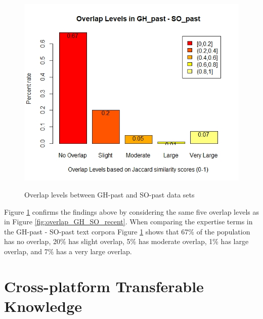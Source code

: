         \begin{figure}
          \centering
          \includegraphics[width=\textwidth]{figures/overlap_SO_GH_past.jpeg}\\
          \caption{Overlap levels between GH-past and SO-past data sets}
          \label{fig:overlap_GH_SO_past}
        \end{figure}
        
        Figure \ref{fig:overlap_GH_SO_past} confirms the findings above by considering the same five overlap levels as in Figure \ref{fig:overlap_GH_SO_recent}. When comparing the expertise terms in the GH-past - SO-past text corpora Figure \ref{fig:overlap_GH_SO_past} shows that 67\% of the population has no overlap, 20\% has slight overlap, 5\% has moderate overlap, 1\% has large overlap, and 7\% has a very large overlap. \\
        
    
    \section{Cross-platform Transferable Knowledge\label{sec:results_rq3}}
        
